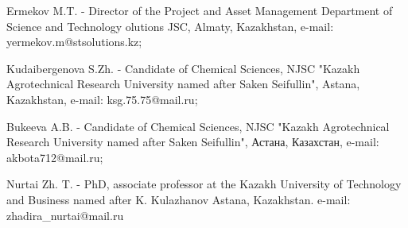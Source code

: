 Ermekov M.T. - Director of the Project and Asset Management Department
of Science and Technology olutions JSC, Almaty, Kazakhstan, e-mail:
yermekov.m@stsolutions.kz;

Kudaibergenova S.Zh. - Candidate of Chemical Sciences, NJSC "Kazakh
Agrotechnical Research University named after Saken Seifullin", Astana,
Kazakhstan, e-mail: ksg.75.75@mail.ru;

Bukeeva A.B. - Candidate of Chemical Sciences, NJSC "Kazakh
Agrotechnical Research University named after Saken Seifullin", Астана,
Казахстан, e-mail: akbota712@mail.ru;

Nurtai Zh. T. - PhD, associate professor at the Kazakh University of
Technology and Business named after K. Kulazhanov Astana, Kazakhstan.
e-mail: zhadira\_nurtai@mail.ru
